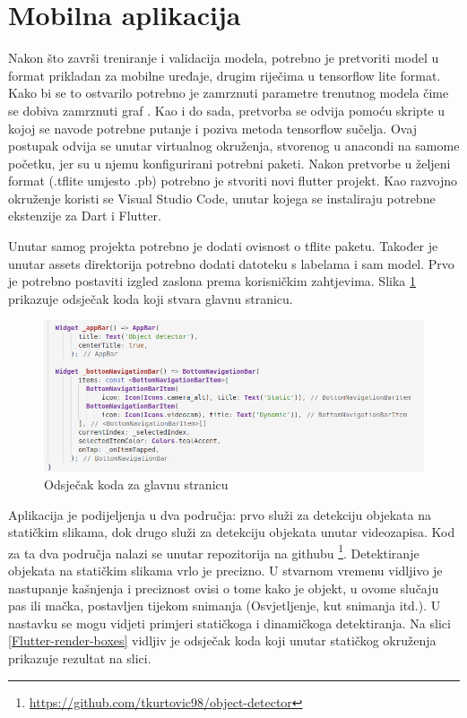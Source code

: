 \section{Mobilna aplikacija}
Nakon što završi treniranje i validacija modela, potrebno je pretvoriti model u format prikladan za mobilne uređaje, drugim riječima u tensorflow lite format. \newline Kako bi se to ostvarilo potrebno je 
zamrznuti parametre trenutnog modela čime se dobiva zamrznuti graf . Kao i do sada, pretvorba se odvija pomoću skripte u kojoj se navode potrebne putanje i poziva 
metoda tensorflow sučelja. Ovaj postupak odvija se unutar virtualnog okruženja, stvorenog u anacondi na samome početku, jer su u njemu konfigurirani potrebni paketi. Nakon pretvorbe u željeni format (.tflite umjesto .pb) potrebno 
je stvoriti novi flutter projekt. Kao razvojno okruženje koristi se Visual Studio Code, unutar kojega se instaliraju potrebne ekstenzije za Dart i Flutter. 

Unutar samog projekta potrebno je dodati ovisnost  o tflite paketu. Također je unutar assets direktorija potrebno dodati datoteku s labelama i sam model. 
Prvo je potrebno postaviti izgled zaslona prema korisničkim zahtjevima. Slika \ref{Flutter-main} prikazuje odsječak koda koji stvara glavnu stranicu.


\begin{figure}[htb]
    \centering
    \includegraphics[width=14cm]{img/flutter-main.png}
    \caption{Odsječak koda za glavnu stranicu}
    \label{Flutter-main}
\end{figure}

Aplikacija je podijeljenja u dva područja: prvo služi za detekciju objekata na statičkim slikama, dok drugo služi za detekciju objekata unutar videozapisa. Kod za ta dva područja nalazi se unutar repozitorija na githubu \footnote{\url{https://github.com/tkurtovic98/object-detector}}.\newline
Detektiranje objekata na statičkim slikama vrlo je precizno. U stvarnom vremenu vidljivo je nastupanje kašnjenja i preciznost ovisi o tome 
kako je objekt, u ovome slučaju pas ili mačka, postavljen tijekom snimanja (Osvjetljenje, kut snimanja itd.). U nastavku se mogu vidjeti primjeri statičkoga i dinamičkoga detektiranja. Na slici \ref{Flutter-render-boxes} vidljiv je odsječak koda koji
unutar statičkog okruženja prikazuje rezultat na slici.

